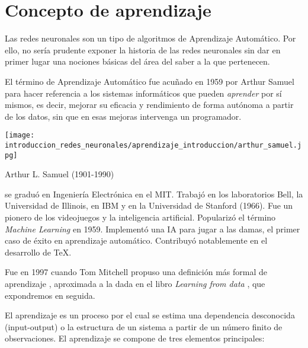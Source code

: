 %

\section{Concepto de aprendizaje}\label{ch:Aprendizaje}

Las redes neuronales son un tipo de algoritmos de Aprendizaje Automático. Por ello, no sería prudente exponer la historia de las redes neuronales sin dar en primer lugar una nociones básicas del área del saber a la que pertenecen.

El término de Aprendizaje Automático 
\cite{hisour} 
fue acuñado en 1959 por Arthur Samuel 
para hacer referencia a los sistemas informáticos que 
pueden \textit{aprender} por sí mismos, es decir, mejorar su 
eficacia y rendimiento de forma autónoma a partir de los datos, 
sin que en esas mejoras intervenga un programador.

\begin{marginfigure}
    \texttt{[image: introduccion\_redes\_neuronales/aprendizaje\_introduccion/arthur\_samuel.jpg]}
    \caption{Arthur L. Samuel (1901-1990) }
    \cite{samuel-wikipedia}
    \small
     se graduó en Ingeniería Electrónica en el MIT. 
     Trabajó en los laboratorios Bell, la Universidad de Illinois,
      en IBM y en la Universidad de Stanford (1966). 
      Fue un pionero de los videojuegos y la inteligencia artificial. 
      Popularizó el término \textit{Machine Learning} en 1959. 
      Implementó una IA para jugar a las damas, el primer caso  
      de éxito en aprendizaje automático. Contribuyó notablemente 
      en el desarrollo de TeX.
\end{marginfigure}

Fue en 1997 cuando Tom Mitchell propuso una definición 
más formal de aprendizaje 
\cite{tom-michell-machine-learning}, 
aproximada a la dada en el libro \textit{Learning from data}
\cite{learning-from-data-1-2}, que expondremos en seguida.

El aprendizaje es un proceso por el cual se estima una dependencia desconocida 
(input-output) o la estructura de un sistema a partir de un número finito de 
observaciones.  El aprendizaje se compone de tres elementos principales: 

